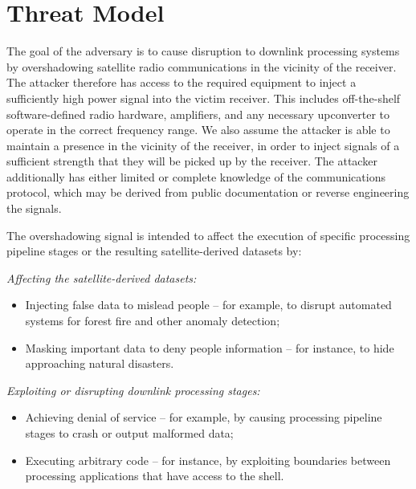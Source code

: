 \section{Threat Model}\label{sec:threat-model}


The goal of the adversary is to cause disruption to downlink processing systems by overshadowing satellite radio communications in the vicinity of the receiver.
The attacker therefore has access to the required equipment to inject a sufficiently high power signal into the victim receiver.
This includes off-the-shelf software-defined radio hardware, amplifiers, and any necessary upconverter to operate in the correct frequency range.
We also assume the attacker is able to maintain a presence in the vicinity of the receiver, in order to inject signals of a sufficient strength that they will be picked up by the receiver.
The attacker additionally has either limited or complete knowledge of the communications protocol, which may be derived from public documentation or reverse engineering the signals.

The overshadowing signal is intended to affect the execution of specific processing pipeline stages or the resulting satellite-derived datasets by:


\noindent\textit{Affecting the satellite-derived datasets:}
\begin{itemize}
    \item Injecting false data to mislead people -- for example, to disrupt automated systems for forest fire and other anomaly detection;
    \item Masking important data to deny people information -- for instance, to hide approaching natural disasters.
\end{itemize}

\noindent\textit{Exploiting or disrupting downlink processing stages:}
\begin{itemize}
    \item Achieving denial of service -- for example, by causing processing pipeline stages to crash or output malformed data;
    \item Executing arbitrary code -- for instance, by exploiting boundaries between processing applications that have access to the shell.
\end{itemize}

